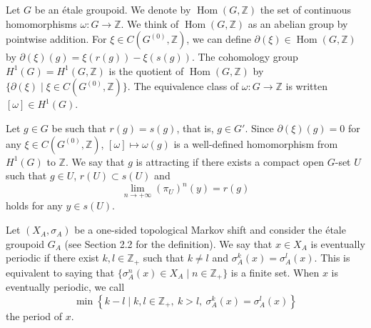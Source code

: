 \documentclass[11pt]{article}
\theoremstyle{definition}
\numberwithin{equation}{section}
\newcommand{\Hom}{\operatorname{Hom}}
\newcommand{\Z}{\mathbb{Z}}
\begin{document}
Let $G$ be an \'etale groupoid. 
We denote by $\Hom(G,\Z)$ the set of continuous homomorphisms $\omega:G\to\Z$. 
We think of $\Hom(G,\Z)$ as an abelian group by pointwise addition. 
For $\xi\in C(G^{(0)},\Z)$, we can define $\partial(\xi)\in\Hom(G,\Z)$ 
by $\partial(\xi)(g)=\xi(r(g))-\xi(s(g))$. 
The cohomology group $H^1(G)=H^1(G,\Z)$ is the quotient of $\Hom(G,\Z)$ 
by $\{\partial(\xi)\mid\xi\in C(G^{(0)},\Z)\}$. 
The equivalence class of $\omega:G\to\Z$ is written $[\omega]\in H^1(G)$. 

Let $g\in G$ be such that $r(g)=s(g)$, that is, $g\in G'$. 
Since $\partial(\xi)(g)=0$ for any $\xi\in C(G^{(0)},\Z)$, 
$[\omega]\mapsto\omega(g)$ is a well-defined homomorphism 
from $H^1(G)$ to $\Z$. 
We say that $g$ is attracting if there exists a compact open $G$-set $U$ 
such that $g\in U$, $r(U)\subset s(U)$ and 
\[
\lim_{n\to+\infty}(\pi_U)^n(y)=r(g)
\]
holds for any $y\in s(U)$. 

Let $(X_A,\sigma_A)$ be a one-sided topological Markov shift and 
consider the \'etale groupoid $G_A$ (see Section 2.2 for the definition). 
We say that $x\in X_A$ is eventually periodic 
if there exist $k,l\in\Z_+$ 
such that $k\neq l$ and $\sigma_A^k(x)=\sigma_A^l(x)$. 
This is equivalent to saying that 
$\{\sigma_A^n(x)\in X_A\mid n\in\Z_+\}$ is a finite set. 
When $x$ is eventually periodic, we call 
\[
\min\left\{k-l\mid k,l\in\Z_+,\ k>l,\ \sigma_A^k(x)=\sigma_A^l(x)\right\}
\]
the period of $x$. 
\end{document}
